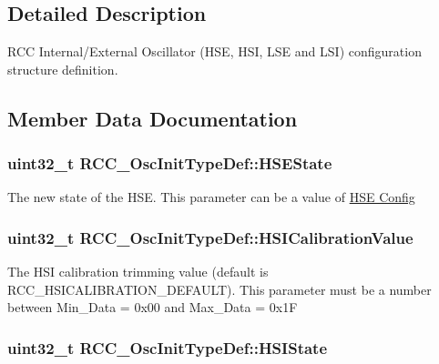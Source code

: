 \subsection{Detailed Description}
R\-C\-C Internal/\-External Oscillator (H\-S\-E, H\-S\-I, L\-S\-E and L\-S\-I) configuration structure definition. 

\subsection{Member Data Documentation}
\hypertarget{struct_r_c_c___osc_init_type_def_a7e05d6eec98ed8cdaba00ca3d167ff72}{
\subsubsection[{H\-S\-E\-State}]{\setlength{\rightskip}{0pt plus 5cm}uint32\-\_\-t R\-C\-C\-\_\-\-Osc\-Init\-Type\-Def\-::\-H\-S\-E\-State}}\label{struct_r_c_c___osc_init_type_def_a7e05d6eec98ed8cdaba00ca3d167ff72}
The new state of the H\-S\-E. This parameter can be a value of \hyperlink{group___r_c_c___h_s_e___config}{H\-S\-E Config} \hypertarget{struct_r_c_c___osc_init_type_def_a9b2e48e452d0c334f2b9473216064560}{
\subsubsection[{H\-S\-I\-Calibration\-Value}]{\setlength{\rightskip}{0pt plus 5cm}uint32\-\_\-t R\-C\-C\-\_\-\-Osc\-Init\-Type\-Def\-::\-H\-S\-I\-Calibration\-Value}}\label{struct_r_c_c___osc_init_type_def_a9b2e48e452d0c334f2b9473216064560}
The H\-S\-I calibration trimming value (default is R\-C\-C\-\_\-\-H\-S\-I\-C\-A\-L\-I\-B\-R\-A\-T\-I\-O\-N\-\_\-\-D\-E\-F\-A\-U\-L\-T). This parameter must be a number between Min\-\_\-\-Data = 0x00 and Max\-\_\-\-Data = 0x1\-F \hypertarget{struct_r_c_c___osc_init_type_def_a39b62cae65fe7a251000354e5bba8cb6}{
\subsubsection[{H\-S\-I\-State}]{\setlength{\rightskip}{0pt plus 5cm}uint32\-\_\-t R\-C\-C\-\_\-\-Osc\-Init\-Type\-Def\-::\-H\-S\-I\-State}}\label{struct_r_c_c___osc_init_type_def_a39b62cae65fe7a251000354e5bba8cb6}
